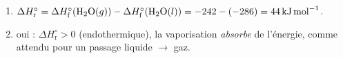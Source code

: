 \documentclass[11pt,a4paper]{article}
\begin{document}
\begin{corrige}
\begin{enumerate}[label=\alph*)]
  \item $\Delta H^\circ_{\text{r}} = \Delta H^\circ_{\text{f}}(\ce{H2O}(g)) - \Delta H^\circ_{\text{f}}(\ce{H2O}(l)) = -242 - (-286) = \qty{+44}{\kilo\joule\per\mol}$.
  \item oui : $\Delta H^\circ_{\text{r}}>0$ (endothermique), la vaporisation \emph{absorbe} de l'énergie, comme attendu pour un passage liquide $\rightarrow$ gaz.
\end{enumerate}
\end{corrige}
\end{document}
